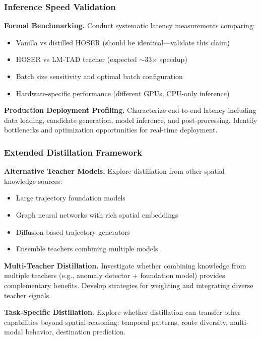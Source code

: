 \subsubsection{Inference Speed Validation}

\textbf{Formal Benchmarking.} Conduct systematic latency measurements comparing:
\begin{itemize}[noitemsep,topsep=0pt]
    \item Vanilla vs distilled HOSER (should be identical—validate this claim)
    \item HOSER vs LM-TAD teacher (expected $\sim$33$\times$ speedup)
    \item Batch size sensitivity and optimal batch configuration
    \item Hardware-specific performance (different GPUs, CPU-only inference)
\end{itemize}

\textbf{Production Deployment Profiling.} Characterize end-to-end latency including data loading, candidate generation, model inference, and post-processing. Identify bottlenecks and optimization opportunities for real-time deployment.

\subsubsection{Extended Distillation Framework}

\textbf{Alternative Teacher Models.} Explore distillation from other spatial knowledge sources:
\begin{itemize}[noitemsep,topsep=0pt]
    \item Large trajectory foundation models~\cite{maLearningUniversalHuman2025}
    \item Graph neural networks with rich spatial embeddings
    \item Diffusion-based trajectory generators~\cite{chuSimulatingHumanMobility2024}
    \item Ensemble teachers combining multiple models
\end{itemize}

\textbf{Multi-Teacher Distillation.} Investigate whether combining knowledge from multiple teachers (e.g., anomaly detector + foundation model) provides complementary benefits. Develop strategies for weighting and integrating diverse teacher signals.

\textbf{Task-Specific Distillation.} Explore whether distillation can transfer other capabilities beyond spatial reasoning: temporal patterns, route diversity, multi-modal behavior, destination prediction.

